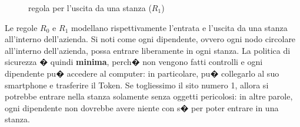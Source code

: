 \begin{figure}[!htbp]
\centering
{}
\caption{regola per l'uscita da una stanza ($R_1$)\label{fig:leaveRoom}}
\end{figure}



Le regole $R_0$ e $R_1$ modellano rispettivamente l'entrata e l'uscita da una stanza all'interno dell'azienda. Si noti come ogni dipendente, ovvero ogni nodo circolare all'interno dell'azienda, possa entrare liberamente in ogni stanza. La politica di sicurezza � quindi \textbf{minima}, perch� non vengono fatti controlli e ogni dipendente pu� accedere al computer: in particolare, pu� collegarlo al suo smartphone e trasferire il Token. Se togliessimo il sito numero 1, allora si potrebbe entrare nella stanza solamente senza oggetti pericolosi: in altre parole, ogni dipendente non dovrebbe avere niente con s� per poter entrare in una stanza.




